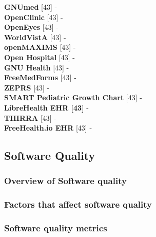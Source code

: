 \documentclass[a4paper]{article}
\begin{document}
{\bf GNUmed} [43] - \\
{\bf OpenClinic} [43] - \\
{\bf OpenEyes} [43] - \\
{\bf WorldVistA} [43] - \\
{\bf openMAXIMS} [43] - \\
{\bf Open Hospital} [43] - \\
{\bf GNU Health} [43] - \\
{\bf FreeMedForms} [43] - \\
{\bf ZEPRS} [43] - \\
{\bf SMART Pediatric Growth Chart} [43] - \\
{\bf LibreHealth EHR [43]} - \\
{\bf THIRRA} [43] - \\
{\bf FreeHealth.io EHR} [43] - \\




\subsection{Software Quality}

\subsubsection{Overview of Software quality}

\subsubsection{Factors that affect software quality}

\subsubsection{Software quality metrics}
\end{document}
